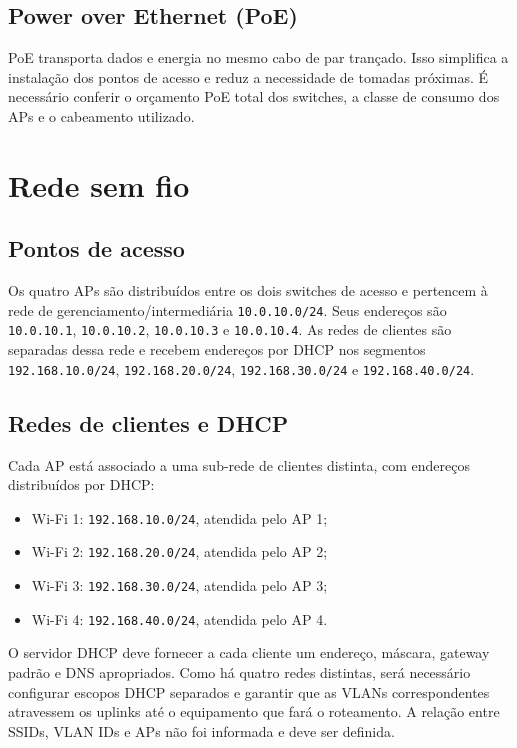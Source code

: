 \documentclass[11pt,a4paper]{article}
\begin{document}
\subsection{Power over Ethernet (PoE)}
PoE transporta dados e energia no mesmo cabo de par trançado. Isso simplifica a instalação dos pontos de acesso e reduz a necessidade de tomadas próximas. É necessário conferir o orçamento PoE total dos switches, a classe de consumo dos APs e o cabeamento utilizado.

\section{Rede sem fio}

\subsection{Pontos de acesso}
Os quatro APs são distribuídos entre os dois switches de acesso e pertencem à rede de gerenciamento/intermediária \texttt{10.0.10.0/24}. Seus endereços são \texttt{10.0.10.1}, \texttt{10.0.10.2}, \texttt{10.0.10.3} e \texttt{10.0.10.4}. As redes de clientes são separadas dessa rede e recebem endereços por DHCP nos segmentos \texttt{192.168.10.0/24}, \texttt{192.168.20.0/24}, \texttt{192.168.30.0/24} e \texttt{192.168.40.0/24}.

\subsection{Redes de clientes e DHCP}
Cada AP está associado a uma sub-rede de clientes distinta, com endereços distribuídos por DHCP:
\begin{itemize}
  \item Wi-Fi 1: \texttt{192.168.10.0/24}, atendida pelo AP 1;
  \item Wi-Fi 2: \texttt{192.168.20.0/24}, atendida pelo AP 2;
  \item Wi-Fi 3: \texttt{192.168.30.0/24}, atendida pelo AP 3;
  \item Wi-Fi 4: \texttt{192.168.40.0/24}, atendida pelo AP 4.
\end{itemize}
O servidor DHCP deve fornecer a cada cliente um endereço, máscara, gateway padrão e DNS apropriados. Como há quatro redes distintas, será necessário configurar escopos DHCP separados e garantir que as VLANs correspondentes atravessem os uplinks até o equipamento que fará o roteamento. A relação entre SSIDs, VLAN IDs e APs não foi informada e deve ser definida.
\end{document}
